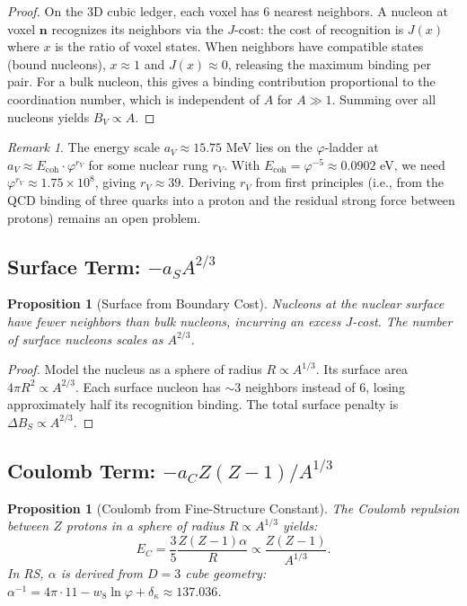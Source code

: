 \documentclass[12pt,a4paper]{article}
\newtheorem{proposition}[theorem]{Proposition}
\theoremstyle{definition}
\theoremstyle{remark}
\newtheorem{remark}[theorem]{Remark}
\begin{document}
\begin{proof}
On the 3D cubic ledger, each voxel has 6 nearest neighbors.
A nucleon at voxel $\mathbf{n}$ recognizes its neighbors via
the $J$-cost: the cost of recognition is $J(x)$ where $x$ is
the ratio of voxel states.  When neighbors have compatible
states (bound nucleons), $x \approx 1$ and $J(x) \approx 0$,
releasing the maximum binding per pair.  For a bulk nucleon,
this gives a binding contribution proportional to the
coordination number, which is independent of $A$ for
$A \gg 1$.  Summing over all nucleons yields $B_V \propto A$.
\end{proof}

\begin{remark}
The energy scale $a_V \approx 15.75$ MeV lies on the
$\varphi$-ladder at $a_V \approx E_{\mathrm{coh}} \cdot
\varphi^{r_V}$ for some nuclear rung $r_V$.  With
$E_{\mathrm{coh}} = \varphi^{-5} \approx 0.0902$ eV,
we need $\varphi^{r_V} \approx 1.75 \times 10^8$,
giving $r_V \approx 39$.  Deriving $r_V$ from first
principles (i.e., from the QCD binding of three quarks into
a proton and the residual strong force between protons)
remains an open problem.
\end{remark}

\subsection{Surface Term: $-a_S A^{2/3}$}

\begin{proposition}[Surface from Boundary Cost]
\label{prop:surface}
Nucleons at the nuclear surface have fewer neighbors than
bulk nucleons, incurring an excess $J$-cost.  The number of
surface nucleons scales as $A^{2/3}$.
\end{proposition}

\begin{proof}
Model the nucleus as a sphere of radius $R \propto A^{1/3}$.
Its surface area $4\pi R^2 \propto A^{2/3}$.  Each surface
nucleon has $\sim 3$ neighbors instead of 6, losing
approximately half its recognition binding.  The total
surface penalty is $\Delta B_S \propto A^{2/3}$.
\end{proof}

\subsection{Coulomb Term: $-a_C Z(Z-1)/A^{1/3}$}

\begin{proposition}[Coulomb from Fine-Structure Constant]
\label{prop:coulomb}
The Coulomb repulsion between $Z$ protons in a sphere of
radius $R \propto A^{1/3}$ yields:
\begin{equation}
  E_C = \frac{3}{5} \frac{Z(Z-1)\alpha}{R}
  \propto \frac{Z(Z-1)}{A^{1/3}}.
\end{equation}
In RS, $\alpha$ is derived from $D = 3$ cube geometry:
$\alpha^{-1} = 4\pi \cdot 11 - w_8 \ln\varphi +
\delta_\kappa \approx 137.036$.
\end{proposition}
\end{document}

